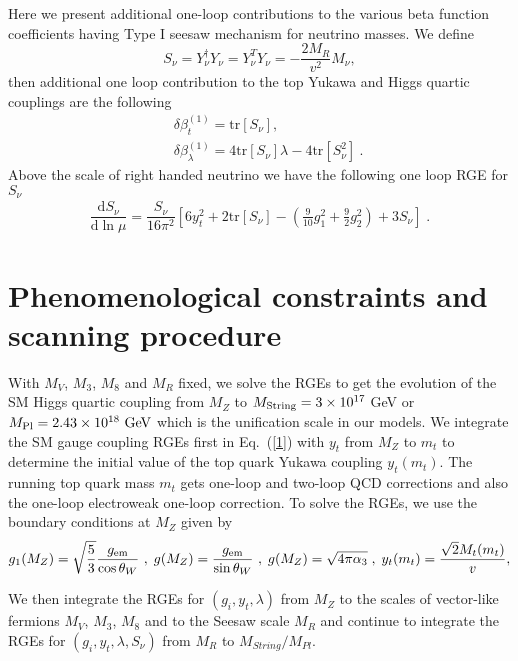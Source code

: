 \documentclass[aps,prd,preprint,superscriptaddress,showpacs,ctexart]{revtex4-1}
\newcommand{\dd}{\mathrm{d}}
\def\tr{\mathrm{tr}}
\begin{document}
Here we present additional one-loop contributions to the various beta
function coefficients having Type I seesaw mechanism for neutrino
masses. We define
\[
S_{\nu}=Y_{\nu}^{\dagger}Y_{\nu}=Y_{\nu}^{T}Y_{\nu}=-\dfrac{2M_{R}}{v^{2}}M_{\nu},
\]
then additional one loop contribution to the top Yukawa and Higgs
quartic couplings are the following
\begin{eqnarray}
 &  & \delta\beta_{t}^{(1)}=\tr[S_{\nu}],\\
 &  & \delta\beta_{\lambda}^{(1)}=4\tr[S_{\nu}]\lambda-4\tr[S_{\nu}^{2}]~.~\,
\end{eqnarray}
Above the scale of right handed neutrino we have the following one
loop RGE for $S_{\nu}$
\begin{eqnarray}
\dfrac{\dd S_{\nu}}{\dd\ln\mu}=\dfrac{S_{\nu}}{16\pi^{2}}\left[6y_{t}^{2}+2\tr[S_{\nu}]-\left(\frac{9}{10}g_{1}^{2}+\frac{9}{2}g_{2}^{2}\right)+3S_{\nu}\right]\;.
\end{eqnarray}


\section{Phenomenological constraints and scanning procedure}

With $M_{V}$, $M_{3}$, $M_{8}$ and $M_{R}$ fixed, we solve the
RGEs to get the evolution of the SM Higgs quartic coupling from $M_{Z}$
to $M_{{\rm String}}=3\times10^{17}~$GeV or $M_{{\rm Pl}}=2.43\times10^{18}~{\rm GeV}$
which is the unification scale in our models. We integrate the SM
gauge coupling RGEs first in Eq.~(\ref{1}) with $y_{t}$ from $M_{Z}$
to $m_{t}$ to determine the initial value of the top quark Yukawa
coupling $y_{t}(m_{t})$. The running top quark mass $m_{t}$ gets
one-loop and two-loop QCD corrections and also the one-loop electroweak
one-loop correction. To solve the RGEs, we use the boundary conditions
at $M_{Z}$ given by
\begin{equation}
g_{1}(M_{Z})=\sqrt{\frac{5}{3}}\dfrac{g_{{\rm em}}}{\cos\theta_{W}}~,\;g(M_{Z})=\dfrac{g_{{\rm em}}}{\sin\theta_{W}}~,\;g(M_{Z})=\sqrt{4\pi\alpha_{3}}\;,\;y_{t}(m_{t})=\dfrac{\sqrt{2}M_{t}(m_{t})}{v},\label{dx}
\end{equation}

We then integrate the RGEs for $(g_{i},y_{t},\lambda)$ from $M_{Z}$
to the scales of vector-like fermions $M_{V}$, $M_{3}$, $M_{8}$
and to the Seesaw scale $M_{R}$ and continue to integrate the RGEs
for $(g_{i},y_{t},\lambda,S_{\nu})$ from $M_{R}$ to $M_{String}/M_{Pl}$.
\end{document}

